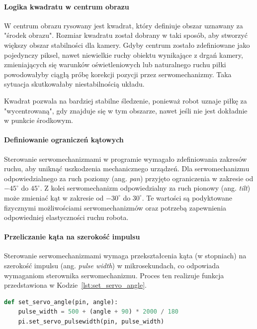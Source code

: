 \documentclass[a4paper,twoside,12pt]{book}
\begin{document}
\newpage
\paragraph{Logika kwadratu w centrum obrazu}
W centrum obrazu rysowany jest kwadrat, który definiuje obszar uznawany za "środek obrazu". Rozmiar kwadratu został dobrany w taki sposób, aby stworzyć większy obszar stabilności dla kamery. Gdyby centrum zostało zdefiniowane jako pojedynczy piksel, nawet niewielkie ruchy obiektu wynikające z drgań kamery, zmieniających się warunków oświetleniowych lub naturalnego ruchu piłki powodowałyby ciągłą próbę korekcji pozycji przez serwomechanizmy. Taka sytuacja skutkowałaby niestabilnością układu.

Kwadrat pozwala na bardziej stabilne śledzenie, ponieważ robot uznaje piłkę za "wycentrowaną", gdy znajduje się w tym obszarze, nawet jeśli nie jest dokładnie w punkcie środkowym.

\paragraph{Definiowanie ograniczeń kątowych}
Sterowanie serwomechanizmami w programie wymagało zdefiniowania zakresów ruchu, aby uniknąć uszkodzenia mechanicznego urządzeń. Dla serwomechanizmu odpowiedzialnego za ruch poziomy (ang. \textit{pan}) przyjęto ograniczenia w zakresie od $-45^{\circ}$ do $45^{\circ}$. Z kolei serwomechanizm odpowiedzialny za ruch pionowy (ang. \textit{tilt}) może zmieniać kąt w zakresie od $-30^{\circ}$ do $30^{\circ}$. Te wartości są podyktowane fizycznymi możliwościami serwomechanizmów oraz potrzebą zapewnienia odpowiedniej elastyczności ruchu robota.

\paragraph{Przeliczanie kąta na szerokość impulsu}
Sterowanie serwomechanizmami wymaga przekształcenia kąta (w stopniach) na szerokość impulsu (ang. \textit{pulse width}) w mikrosekundach, co odpowiada wymaganiom sterownika serwomechanizmu. Proces ten realizuje funkcja przedstawiona w Kodzie~\ref{lst:set_servo_angle}.

\begin{lstlisting}[language=Python, caption={Przeliczanie kąta na szerokość impulsu.}, label={lst:set_servo_angle}, captionpos=b]
def set_servo_angle(pin, angle):
    pulse_width = 500 + (angle + 90) * 2000 / 180
    pi.set_servo_pulsewidth(pin, pulse_width)
\end{lstlisting}
\end{document}
